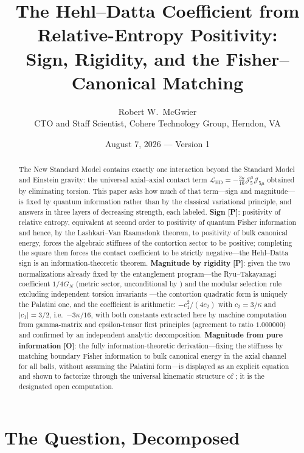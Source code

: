 \documentclass[11pt]{article}
\title{\textbf{The Hehl--Datta Coefficient from Relative-Entropy
Positivity:\\ Sign, Rigidity, and the Fisher--Canonical Matching}}
\author{Robert W.\ McGwier\\
\small CTO and Staff Scientist, Cohere Technology Group, Herndon, VA}
\date{August 7, 2026 --- Version 1}
\theoremstyle{definition}
\newcommand{\pP}{\textbf{[P]}}
\newcommand{\pO}{\textbf{[O]}}
\begin{document}
\maketitle

\begin{abstract}
\noindent
The New Standard Model \cite{McGwier2026c} contains exactly one
interaction beyond the Standard Model and Einstein gravity: the universal
axial--axial contact term
$\mathcal L_{\mathrm{HD}}=-\tfrac{3\kappa}{16}\mathcal J_5^\mu
\mathcal J_{5\mu}$ obtained by eliminating torsion. This paper asks how
much of that term---sign and magnitude---is fixed by quantum information
rather than by the classical variational principle, and answers in three
layers of decreasing strength, each labeled. \textbf{Sign} \pP{}:
positivity of relative entropy, equivalent at second order to positivity
of quantum Fisher information and hence, by the
Lashkari--Van Raamsdonk theorem, to positivity of bulk canonical energy,
forces the algebraic stiffness of the contortion sector to be positive;
completing the square then forces the contact coefficient to be strictly
negative---the Hehl--Datta sign is an information-theoretic theorem.
\textbf{Magnitude by rigidity} \pP{}: given the two normalizations
already fixed by the entanglement program---the Ryu--Takayanagi
coefficient $1/4G_N$ (metric sector, unconditional by
\cite{McGwier2026d}) and the modular selection rule excluding independent
torsion invariants \cite{McGwier2026b}---the contortion quadratic form is
uniquely the Palatini one, and the coefficient is arithmetic:
$-c_1^2/(4c_2)$ with $c_2=3/\kappa$ and $|c_1|=3/2$, i.e.\
$-3\kappa/16$, with both constants extracted here by machine computation
from gamma-matrix and epsilon-tensor first principles (agreement to
ratio $1.000000$) and confirmed by an independent analytic decomposition.
\textbf{Magnitude from pure information} \pO{}: the fully
information-theoretic derivation---fixing the stiffness by matching
boundary Fisher information to bulk canonical energy in the axial channel
for all balls, without assuming the Palatini form---is displayed as an
explicit equation and shown to factorize through the universal kinematic
structure of \cite{McGwier2026d}; it is the designated open computation.
\end{abstract}

\section{The Question, Decomposed}
\end{document}
